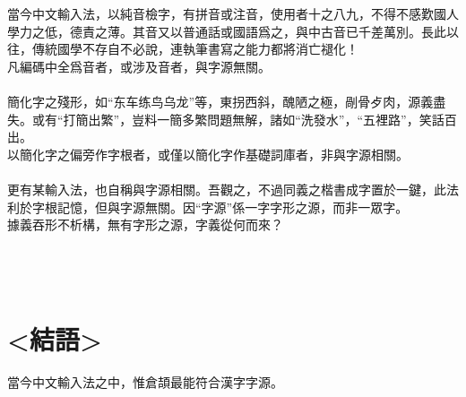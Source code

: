 \documentclass{article}
\begin{document}
當今中文輸入法，以純音檢字，有拼音或注音，使用者十之八九，不得不感歎國人學力之低，德責之薄。其音又以普通話或國語爲之，與中古音已千差萬別。長此以往，傳統國學不存自不必說，連執筆書寫之能力都將消亡褪化！\\
凡編碼中全爲音者，或涉及音者，與字源無關。\\
\\
簡化字之殘形，如“东车练鸟乌龙”等，東拐西斜，醜陋之極，剮骨歺肉，源義盡失。或有“打簡出繁”，豈料一簡多繁問題無解，諸如“洗發水”，“五裡路”，笑話百出。\\
以簡化字之偏旁作字根者，或僅以簡化字作基礎詞庫者，非與字源相關。\\
\\
更有某輸入法，也自稱與字源相關。吾觀之，不過同義之楷書成字置於一鍵，此法利於字根記憶，但與字源無關。因“字源”係一字字形之源，而非一眾字。\\
據義吞形不析構，無有字形之源，字義從何而來？\\
\\
\\
\\
\section{<結語>}

當今中文輸入法之中，惟倉頡最能符合漢字字源。\\
\end{document}
